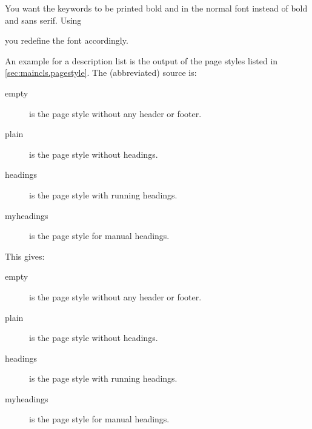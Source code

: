     \begin{Example}
      You want the keywords to be printed bold and in the normal font instead 
      of bold and sans serif. Using
\begin{lstcode}
\end{lstcode}
      you redefine the font accordingly.

      An example for a description list is the output of the page styles
      listed in \autoref{sec:maincls.pagestyle}. The (abbreviated) source is:
\begin{lstcode}
  \begin{description}
    \item[empty] is the page style without any header or footer.
    \item[plain] is the page style without headings.
    \item[headings] is the page style with running headings.
    \item[myheadings] is the page style for manual headings.
  \end{description}
\end{lstcode}
      This gives:
      \begin{ShowOutput}
        \begin{description}
        \item[empty] is the page style without any header or footer.
        \item[plain] is the page style without headings.
        \item[headings] is the page style with running headings.
        \item[myheadings] is the page style for manual headings.
        \end{description}
      \end{ShowOutput}
    \end{Example}
  \fi%
  \EndIndexGroup%
\fi

